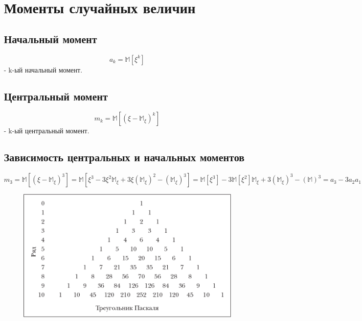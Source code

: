 \documentclass[../Main.tex]{subfiles}
\begin{document}
\chapter{Моменты случайных величин}

\section{Начальный момент}
\[a_k = \mathbb{M}[\xi^k]\] - k-ый начальный момент.

\section{Центральный момент}
\[m_k = \mathbb{M}[(\xi - \mathbb{M}_\xi)^k]\] - k-ый центральный момент.
\section{Зависимость центральных и начальных моментов}

\(m_3 = \mathbb{M}[(\xi - \mathbb{M}_\xi)^3] = \mathbb{M}[\xi^3 - 3\xi^2\mathbb{M}_\xi + 3\xi(\mathbb{M}_\xi)^2 - (\mathbb{M}_\xi)^3] = \mathbb{M}[\xi^3] - 3\mathbb{M}[\xi^2]\mathbb{M}_\xi+3(\mathbb{M}_\xi)^3 - (\mathbb{M})^ 3 = a_3 - 3a_2a_1 + 2(a_1)^3\)


\begin{figure}
    \centering
    \includegraphics[width=0.9\linewidth]{Images/паскаль.png}
\end{figure}
\end{document}
